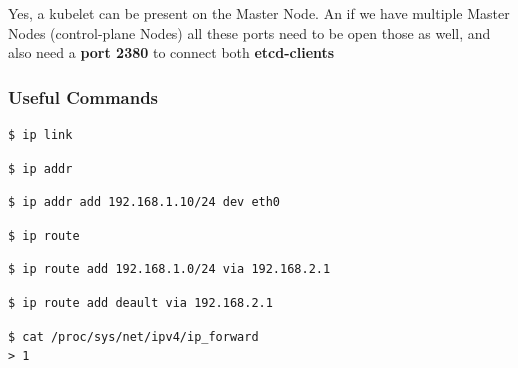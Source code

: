 \documentclass{article}
\newenvironment{blocktemplate}[1]{%
    \tcolorbox[beamer,%
    noparskip,breakable,
    colframe=Blue,%
    colbacklower=LimeGreen!75!LightGreen,%
    title=#1]}%
    {\endtcolorbox}
\newenvironment{codetemplate}[1][]{%
  \mybasecolorbox[#1]
  \itshape
}{%
  \endmybasecolorbox
}
\begin{document}
\begin{blocktemplate}{NOTE}
Yes, a kubelet can be present on the Master Node. An if we have multiple Master Nodes (control-plane Nodes) all these ports need to be open those as well, and also need a \textbf{port 2380} to connect both \textbf{etcd-clients}
\end{blocktemplate}

\subsubsection{Useful Commands}

\begin{codetemplate}{}
\begin{verbatim}
$ ip link
\end{verbatim}
\end{codetemplate}

\begin{codetemplate}{}
\begin{verbatim}
$ ip addr
\end{verbatim}
\end{codetemplate}

\begin{codetemplate}{}
\begin{verbatim}
$ ip addr add 192.168.1.10/24 dev eth0
\end{verbatim}
\end{codetemplate}

\begin{codetemplate}{}
\begin{verbatim}
$ ip route
\end{verbatim}
\end{codetemplate}

\begin{codetemplate}{}
\begin{verbatim}
$ ip route add 192.168.1.0/24 via 192.168.2.1
\end{verbatim}
\end{codetemplate}

\begin{codetemplate}{}
\begin{verbatim}
$ ip route add deault via 192.168.2.1
\end{verbatim}
\end{codetemplate}

\begin{codetemplate}{}
\begin{verbatim}
$ cat /proc/sys/net/ipv4/ip_forward
> 1
\end{verbatim}
\end{codetemplate}
\end{document}
